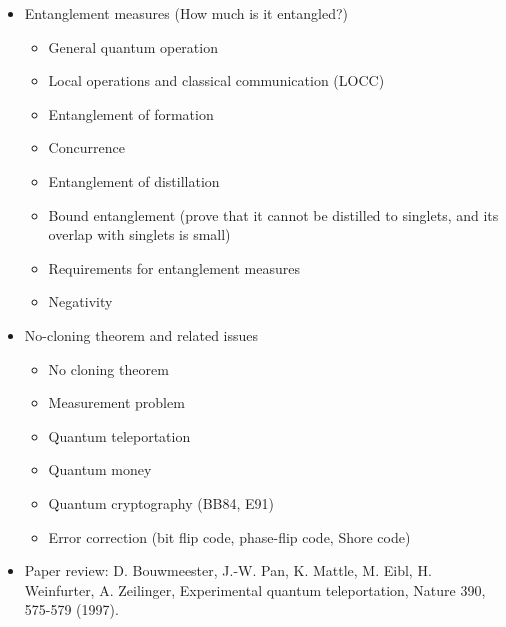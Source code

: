 \documentclass[11pt, oneside]{article}   	%
\begin{document}
\begin{itemize}
\item Entanglement measures (How much is it entangled?)
\begin{itemize}
\item General quantum operation
\item Local operations and classical communication (LOCC)
\item Entanglement of formation
\item Concurrence
\item Entanglement of distillation
\item Bound entanglement (prove that it cannot be distilled to singlets, and its overlap with singlets is small)
\item Requirements for entanglement measures
\item Negativity
\end{itemize}

\item No-cloning theorem and related issues
\begin{itemize}
\item No cloning theorem
\item Measurement problem
\item Quantum teleportation
\item Quantum money
\item Quantum cryptography (BB84, E91)
\item Error correction (bit flip code, phase-flip code, Shore code)
\end{itemize}

\item Paper review: D. Bouwmeester, J.-W. Pan, K. Mattle, M. Eibl, H. Weinfurter, A. Zeilinger, Experimental quantum teleportation, Nature 390, 575-579 (1997).


\end{itemize}
\end{document}
